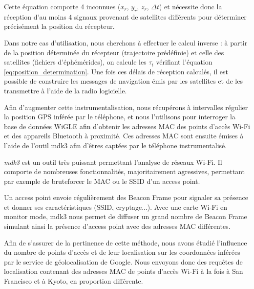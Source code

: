\documentclass[runningheads]{llncs}
\begin{document}
Cette équation comporte 4 inconnues ($x_r$, $y_r$, $z_r$, $\Delta t$) et nécessite donc la réception d'au moins 4 signaux provenant de satellites différents pour déterminer précisément la position du récepteur. 

Dans notre cas d'utilisation, nous cherchons à effectuer le calcul inverse : à partir de la position déterminée du récepteur (trajectoire prédéfinie) et celle des satellites (fichiers d'éphémérides), on calcule les $\tau_i$ vérifiant l'équation \ref{eq:position_determination}. Une fois ces délais de réception calculés, il est possible de construire les messages de navigation émis par les satellites et de les transmettre à l'aide de la radio logicielle.

Afin d'augmenter cette instrumentalisation, nous récupérons à intervalles régulier la position GPS inférée par le téléphone, et nous l'utilisons pour interroger la base de données WiGLE afin d'obtenir les adresses MAC des points d'accès Wi-Fi et des appareils Bluetooth à proximité. Ces adresses MAC sont ensuite émises à l'aide de l'outil mdk3 \cite{aspj_mdk3_2013} afin d'êtres captées par le téléphone instrumentalisé.

\textit{mdk3} est un outil très puissant permettant l'analyse de réseaux Wi-Fi. Il comporte de nombreuses fonctionnalités, majoritairement agressives, permettant par exemple de bruteforcer le MAC ou le SSID d'un access point.

Un access point envoie régulièrement des Beacon Frame pour signaler sa présence et donner ses caractéristiques (SSID, cryptage...). Avec une carte Wi-Fi en monitor mode, mdk3 nous permet de diffuser un grand nombre de Beacon Frame simulant ainsi la présence d'access point avec des adresses MAC différentes.

Afin de s'assurer de la pertinence de cette méthode, nous avons étudié l'influence du nombre de points d'accès et de leur localisation sur les coordonnées inférées par le service de géolocalisation de Google. Nous envoyons donc des requêtes de localisation contenant des adresses MAC de points d'accès Wi-Fi à la fois à San Francisco et à Kyoto, en proportion différente.
\end{document}
